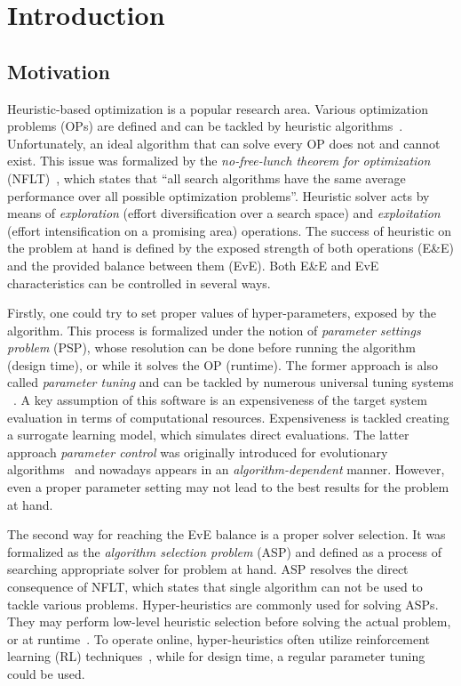 \chapter{Introduction}\label{intro}

\section{Motivation}
Heuristic-based optimization is a popular research area. Various optimization problems (OPs) are defined and can be tackled by heuristic algorithms~\cite{junger2003combinatorial,biegler2004retrospective,festa2014brief}. Unfortunately, an ideal algorithm that can solve every OP does not and cannot exist. This issue was formalized by the \emph{no-free-lunch theorem for optimization} (NFLT)~\cite{wolpert1997no}, which states that ``all search algorithms have the same average performance over all possible optimization problems''. Heuristic solver acts by means of \emph{exploration} (effort diversification over a search space) and \emph{exploitation} (effort intensification on a promising area) operations. The success of heuristic on the problem at hand is defined by the exposed strength of both operations (E\&E) and the provided balance between them (EvE). Both E\&E and EvE characteristics can be controlled in several ways.

Firstly, one could try to set proper values of hyper-parameters, exposed by the algorithm. This process is formalized under the notion of \emph{parameter settings problem} (PSP), whose resolution can be done before running the algorithm (design time), or while it solves the OP (runtime). The former approach is also called \emph{parameter tuning} and can be tackled by numerous universal tuning systems ~\cite{hutter2009paramils,hutter2011sequential,lopez2016irace,falkner2018bohb,brise2spl}. A key assumption of this software is an expensiveness of the target system evaluation in terms of computational resources. Expensiveness is tackled creating a surrogate learning model, which simulates direct evaluations. The latter approach \emph{parameter control} was originally introduced for evolutionary algorithms~\cite{karafotias2014parameter} and nowadays appears in an \emph{algorithm-dependent} manner. However, even a proper parameter setting may not lead to the best results for the problem at hand. 

The second way for reaching the EvE balance is a proper solver selection. It was formalized as the \emph{algorithm selection problem} (ASP) and defined as a process of searching appropriate solver for problem at hand. ASP resolves the direct consequence of NFLT, which states that single algorithm can not be used to tackle various problems. Hyper-heuristics are commonly used for solving ASPs. They may perform low-level heuristic selection before solving the actual problem, or at runtime~\cite{burke2019classification}. To operate online, hyper-heuristics often utilize reinforcement learning (RL) techniques~\cite{moriarty1999evolutionary,mcclymont2011markov}, while for design time, a regular parameter tuning could be used.

